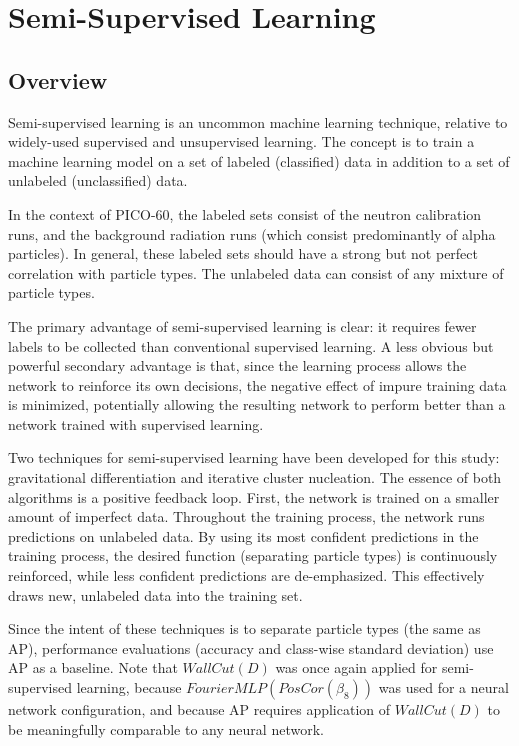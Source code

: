 \documentclass[10pt]{article}
\begin{document}
\section{Semi-Supervised Learning} \label{semi_supervised}

\subsection{Overview}

Semi-supervised learning is an uncommon machine learning technique, relative to widely-used supervised and unsupervised learning. The concept is to train a machine learning model on a set of labeled (classified) data in addition to a set of unlabeled (unclassified) data.

In the context of PICO-60, the labeled sets consist of the neutron calibration runs, and the background radiation runs (which consist predominantly of alpha particles). In general, these labeled sets should have a strong but not perfect correlation with particle types. The unlabeled data can consist of any mixture of particle types.

The primary advantage of semi-supervised learning is clear: it requires fewer labels to be collected than conventional supervised learning. A less obvious but powerful secondary advantage is that, since the learning process allows the network to reinforce its own decisions, the negative effect of impure training data is minimized, potentially allowing the resulting network to perform better than a network trained with supervised learning.

Two techniques for semi-supervised learning have been developed for this study: gravitational differentiation and iterative cluster nucleation. The essence of both algorithms is a positive feedback loop. First, the network is trained on a smaller amount of imperfect data. Throughout the training process, the network runs predictions on unlabeled data. By using its most confident predictions in the training process, the desired function (separating particle types) is continuously reinforced, while less confident predictions are de-emphasized. This effectively draws new, unlabeled data into the training set.

Since the intent of these techniques is to separate particle types (the same as AP), performance evaluations (accuracy and class-wise standard deviation) use AP as a baseline. Note that $WallCut(D)$ was once again applied for semi-supervised learning, because $FourierMLP(PosCor(\beta_{8}))$ was used for a neural network configuration, and because AP requires application of $WallCut(D)$ to be meaningfully comparable to any neural network.
\end{document}
